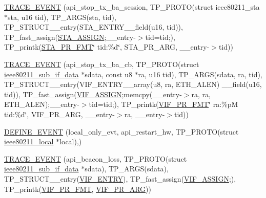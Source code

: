 \begin{DoxyCompactItemize}
\item 
\hyperlink{driver-trace_8h_a28abbcaaad8582ac5ea9adf03455cf05}{T\-R\-A\-C\-E\-\_\-\-E\-V\-E\-N\-T} (api\-\_\-stop\-\_\-tx\-\_\-ba\-\_\-session, T\-P\-\_\-\-P\-R\-O\-T\-O(struct ieee80211\-\_\-sta $\ast$sta, u16 tid), T\-P\-\_\-\-A\-R\-G\-S(sta, tid), T\-P\-\_\-\-S\-T\-R\-U\-C\-T\-\_\-\-\_\-entry(S\-T\-A\-\_\-\-E\-N\-T\-R\-Y\-\_\-\-\_\-field(u16, tid)), T\-P\-\_\-fast\-\_\-assign(\hyperlink{driver-trace_8h_abbd837b5fc444c0cb48b5954f8ad068a}{S\-T\-A\-\_\-\-A\-S\-S\-I\-G\-N};\-\_\-\-\_\-entry-\/$>$tid=tid;), T\-P\-\_\-printk(\hyperlink{driver-trace_8h_a73d0cd445b999888e3f21698b769c843}{S\-T\-A\-\_\-\-P\-R\-\_\-\-F\-M\-T}\char`\"{} tid\-:\%d\char`\"{}, S\-T\-A\-\_\-\-P\-R\-\_\-\-A\-R\-G, \-\_\-\-\_\-entry-\/$>$tid))
\item 
\hyperlink{driver-trace_8h_af47d5cd6edab5c635184d77ed2442084}{T\-R\-A\-C\-E\-\_\-\-E\-V\-E\-N\-T} (api\-\_\-stop\-\_\-tx\-\_\-ba\-\_\-cb, T\-P\-\_\-\-P\-R\-O\-T\-O(struct \hyperlink{structieee80211__sub__if__data}{ieee80211\-\_\-sub\-\_\-if\-\_\-data} $\ast$sdata, const u8 $\ast$ra, u16 tid), T\-P\-\_\-\-A\-R\-G\-S(sdata, ra, tid), T\-P\-\_\-\-S\-T\-R\-U\-C\-T\-\_\-\-\_\-entry(V\-I\-F\-\_\-\-E\-N\-T\-R\-Y\-\_\-\-\_\-array(u8, ra, E\-T\-H\-\_\-\-A\-L\-E\-N) \-\_\-\-\_\-field(u16, tid)), T\-P\-\_\-fast\-\_\-assign(\hyperlink{driver-trace_8h_af5ede80f04ffcb3f644f68837b1d252c}{V\-I\-F\-\_\-\-A\-S\-S\-I\-G\-N};memcpy(\-\_\-\-\_\-entry-\/$>$ra, ra, E\-T\-H\-\_\-\-A\-L\-E\-N);\-\_\-\-\_\-entry-\/$>$tid=tid;), T\-P\-\_\-printk(\hyperlink{driver-trace_8h_a50711161ccfc99a73b43b988149a61a5}{V\-I\-F\-\_\-\-P\-R\-\_\-\-F\-M\-T}\char`\"{} ra\-:\%p\-M tid\-:\%d\char`\"{}, V\-I\-F\-\_\-\-P\-R\-\_\-\-A\-R\-G, \-\_\-\-\_\-entry-\/$>$ra, \-\_\-\-\_\-entry-\/$>$tid))
\item 
\hyperlink{driver-trace_8h_a8b68e8652601951d2577ac9f0ca9d594}{D\-E\-F\-I\-N\-E\-\_\-\-E\-V\-E\-N\-T} (local\-\_\-only\-\_\-evt, api\-\_\-restart\-\_\-hw, T\-P\-\_\-\-P\-R\-O\-T\-O(struct \hyperlink{structieee80211__local}{ieee80211\-\_\-local} $\ast$local),)
\item 
\hyperlink{driver-trace_8h_a887d2b934134e4a5b051f9840613fae4}{T\-R\-A\-C\-E\-\_\-\-E\-V\-E\-N\-T} (api\-\_\-beacon\-\_\-loss, T\-P\-\_\-\-P\-R\-O\-T\-O(struct \hyperlink{structieee80211__sub__if__data}{ieee80211\-\_\-sub\-\_\-if\-\_\-data} $\ast$sdata), T\-P\-\_\-\-A\-R\-G\-S(sdata), T\-P\-\_\-\-S\-T\-R\-U\-C\-T\-\_\-\-\_\-entry(\hyperlink{driver-trace_8h_af9528f0b6f59f04b6c6ab283b1b65d9d}{V\-I\-F\-\_\-\-E\-N\-T\-R\-Y}), T\-P\-\_\-fast\-\_\-assign(\hyperlink{driver-trace_8h_af5ede80f04ffcb3f644f68837b1d252c}{V\-I\-F\-\_\-\-A\-S\-S\-I\-G\-N};), T\-P\-\_\-printk(\hyperlink{driver-trace_8h_a50711161ccfc99a73b43b988149a61a5}{V\-I\-F\-\_\-\-P\-R\-\_\-\-F\-M\-T}, \hyperlink{driver-trace_8h_a12c9f3afcd1c461f7ae2f86fd8503977}{V\-I\-F\-\_\-\-P\-R\-\_\-\-A\-R\-G}))

\end{DoxyCompactItemize}
